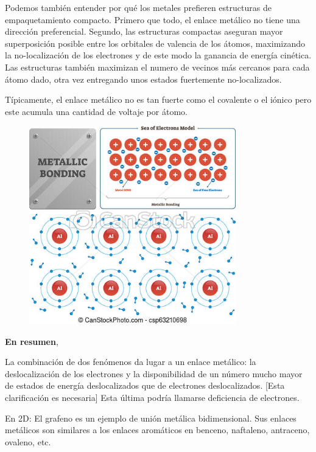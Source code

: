 \documentclass{article}
\begin{document}
Podemos también entender por qué los metales prefieren estructuras de empaquetamiento compacto. Primero que todo, el enlace metálico no tiene una dirección preferencial. Segundo, las estructuras compactas aseguran mayor superposición posible entre los orbitales de valencia de los átomos, maximizando la no-localización de los electrones y de este modo la ganancia de energía cinética. Las estructuras también maximizan el numero de vecinos más cercanos para cada átomo dado, otra vez entregando unos estados fuertemente no-localizados.

Típicamente, el enlace metálico no es tan fuerte como el covalente o el iónico pero este acumula una cantidad de voltaje por átomo.

\begin{figure}[h]
    \centering
    \includegraphics[width=0.8\textwidth]{metallic-bonding-vector-illustration-drawing_csp63210698.jpg}
    
    \label{Figura 1}
\end{figure}

\textbf{En resumen},

La combinación de dos fenómenos da lugar a un enlace metálico: la deslocalización de los electrones y la disponibilidad de un número mucho mayor de estados de energía deslocalizados que de electrones deslocalizados. [Esta clarificación es necesaria] Esta última podría llamarse deficiencia de electrones.

En 2D:  El grafeno es un ejemplo de unión metálica bidimensional. Sus enlaces metálicos son similares a los enlaces aromáticos en benceno, naftaleno, antraceno, ovaleno, etc.
\end{document}
